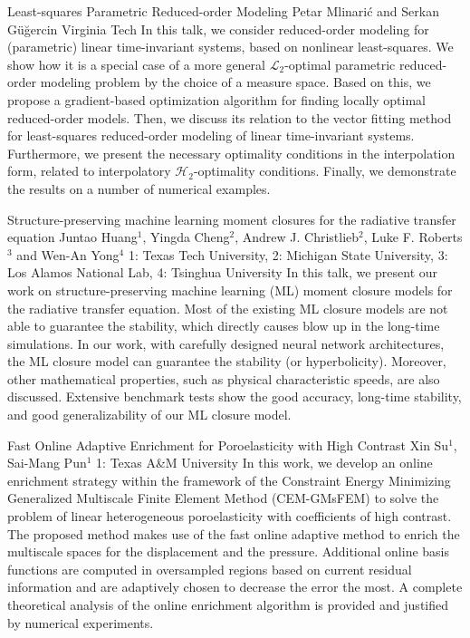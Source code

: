 \begin{addmargin}[2em]{0em}
\vspace{1.5ex}
\abs
{Least-squares Parametric Reduced-order Modeling}
{Petar Mlinari\'{c} and Serkan G\"{u}\u{g}ercin}
{Virginia Tech}
{In this talk, we consider reduced-order modeling for (parametric) linear time-invariant systems, based on nonlinear least-squares. We show how it is a special case of a more general $\mathcal{L}_2$-optimal parametric reduced-order modeling problem by the choice of a measure space. Based on this, we propose a gradient-based optimization algorithm for finding locally optimal reduced-order models. Then, we discuss its relation to the vector fitting method for least-squares reduced-order modeling of linear time-invariant systems. Furthermore, we present the necessary optimality conditions in the interpolation form, related to interpolatory $\mathcal{H}_2$-optimality conditions. Finally, we demonstrate the results on a number of numerical examples.}


\vspace{1.5ex}
\abs
{Structure-preserving machine learning moment closures for the radiative transfer equation}
{Juntao Huang$^{1}$, Yingda Cheng$^{2}$, Andrew J. Christlieb$^{2}$, Luke F. Roberts$^{3}$ and Wen-An Yong$^{4}$}
{1: Texas Tech University, 2: Michigan State University, 3: Los Alamos National Lab, 4: Tsinghua University}
{In this talk, we present our work on structure-preserving machine learning (ML) moment closure models for the radiative transfer equation. Most of the existing ML closure models are not able to guarantee the stability, which directly causes blow up in the long-time simulations. In our work, with carefully designed neural network architectures, the ML closure model can guarantee the stability (or hyperbolicity). Moreover, other mathematical properties, such as physical characteristic speeds, are also discussed. Extensive benchmark tests show the good accuracy, long-time stability, and good generalizability of our ML closure model.}


\vspace{1.5ex}
\abs
{Fast Online Adaptive Enrichment for Poroelasticity with High Contrast}
{Xin Su$^{1}$, Sai-Mang Pun$^{1}$}
{1: Texas A\&M University}
{In this work, we develop an online enrichment strategy within the framework of the Constraint Energy Minimizing Generalized Multiscale Finite Element Method (CEM-GMsFEM) to solve the problem of linear heterogeneous poroelasticity with coefficients of high contrast. The proposed method makes use of the fast online adaptive method to enrich the multiscale spaces for the displacement and the pressure. Additional online basis functions are computed in oversampled regions based on current residual information and are adaptively chosen to decrease the error the most. A complete theoretical analysis of the online enrichment algorithm is provided and justified by numerical experiments.
}



\end{addmargin}
